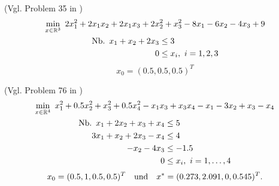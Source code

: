 \begin{testproblem}
(Vgl. Problem 35 in \cite[S.~58]{hock})
\begin{gather}
\min_{x\in\R^3}\ 2 x_1^2 + 2 x_1 x_2 + 2 x_1 x_3 + 2 x_2^2 + x_3^2 - 8 x_1 - 6 x_2 - 4 x_3 + 9 \notag \\
\begin{split}
\nb x_1 + x_2 + 2 x_3 & \leq 3 \\
0 & \leq x_i,\ i = 1,2,3 \\
\end{split}
\end{gather}
\begin{equation*}
x_0 = (0.5, 0.5, 0.5)^T
\end{equation*}
\end{testproblem}

\begin{testproblem}
(Vgl. Problem 76 in \cite[S.~96]{hock})
\begin{gather}
\min_{x\in\R^4}\ x_1^2 + 0.5 x_2^2 + x_3^2 + 0.5 x_4^2 - x_1 x_3 + x_3 x_4 - x_1 - 3 x_2 + x_3 - x_4 \notag \\
\begin{split}
\nb x_1 + 2 x_2 + x_3 + x_4 & \leq 5 \\
3 x_1 + x_2 + 2 x_3 - x_4 & \leq 4 \\
-x_2 - 4 x_3 & \leq -1.5 \\
0 & \leq x_i,\ i = 1,\ldots,4 \\
\end{split}
\end{gather}
\begin{equation*}
x_0 = (0.5, 1, 0.5, 0.5)^T \quad\text{und}\quad x^* = (0.273, 2.091, 0, 0.545)^T.
\end{equation*}
\end{testproblem}
